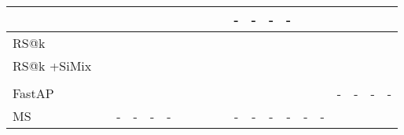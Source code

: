 \begin{table*}[t]
\begin{center}
\begin{tabular}{@{\zsp}l@{\xssp}l@{\xssp}|cccc|cccc|cc|cc|cc|cccc}
	 &
	 &
	 &
	 &

     &
     &
     &
     &
     &
     &
    
    - &
    - &
    - &
    -
	\\
	
	\hline
	RS@k\textsuperscript{\dag} & {\scriptsize} &
	  &
	  &
	  &
	 &
	
	 &
	 &
	 &
	 &

     &
     &
     &
     &
     &
     &
    
     &
     &
     &
    
	\\



	RS@k\textsuperscript{\dag} +SiMix & {\scriptsize} &
	 & 
	 & 
	 & 
	 &
	
	 &
	 &
	 &
	 &

     &
     &
     &
     &
     &
     &
    
     &
     &
     &
     
	\\

	& & 
	\tiny{\textcolor{blue}{}} &
	\tiny{\textcolor{blue}{}} &
	\tiny{\textcolor{blue}{}} &
	\tiny{\textcolor{blue}{}} &
	
	\tiny{\textcolor{blue}{}} &
	\tiny{\textcolor{blue}{}} &
	\tiny{\textcolor{blue}{}} &
	\tiny{\textcolor{blue}{}} &

	\tiny{\textcolor{blue}{}} &
	\tiny{\textcolor{blue}{}} &
	\tiny{\textcolor{blue}{}} &
	\tiny{\textcolor{blue}{}} &
	\tiny{\textcolor{blue}{}} &
	\tiny{\textcolor{blue}{}} &

	\tiny{\textcolor{blue}{}} &
	\tiny{\textcolor{blue}{}} &
	\tiny{\textcolor{blue}{}} &
	\tiny{\textcolor{blue}{}}
	\\
	




    \hline \hline
	FastAP \cite{chx+19} & {\scriptsize} &
	 & 
	 & 
	 & 
	 &

	 &
	 & 
	 & 
	 &

     &
     &
     &
     &
     &
     &
    
    - &
    - &
    - &
    -
	\\
	
	MS \cite{whh+19} & {\scriptsize} &
	- &
	- &
	- &
	- &
	
	 &
	 &
	 &
	 &

	- &
	- &
	- &
	- &
	- &
	- &
	
	 &
	 &
	 &
	

\end{tabular}
\end{center}
\end{table*}

